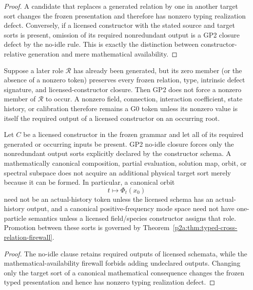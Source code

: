 \documentclass[12pt,a4paper]{article}
\begin{document}
\begin{proof}
A candidate that replaces a generated relation by one in another target sort
changes the frozen presentation and therefore has nonzero typing realization
defect.  Conversely, if a licensed constructor with the stated source and
target sorts is present, omission of its required nonredundant output is a GP2
closure defect by the no-idle rule.  This is exactly the distinction between
constructor-relative generation and mere mathematical availability.
\end{proof}

\begin{corollary}
\label{p2a:cor:zero-member-occurrence-test}
Suppose a later role \(\mathcal R\) has already been generated, but its zero
member (or the absence of a nonzero token) preserves every frozen relation,
type, intrinsic defect signature, and licensed-constructor closure.  Then GP2
does not force a nonzero member of \(\mathcal R\) to occur.  A nonzero field,
connection, interaction coefficient, state history, or calibration therefore
remains a G0 token unless its nonzero value is itself the required output of a
licensed constructor on an occurring root.
\end{corollary}

\begin{corollary}
\label{p2a:cor:declared-output-actualization-boundary}
Let \(C\) be a licensed constructor in the frozen grammar and let all of its
required generated or occurring inputs be present.  GP2 no-idle closure forces
only the nonredundant output sorts explicitly declared by the constructor
schema.  A mathematically canonical composition, partial evaluation, solution
map, orbit, or spectral subspace does not acquire an additional physical target
sort merely because it can be formed.  In particular, a canonical orbit
\[
  t\longmapsto \Phi_t(x_0)
\]
need not be an actual-history token unless the licensed schema has an
actual-history output, and a canonical positive-frequency mode space need not
have one-particle semantics unless a licensed field/species constructor assigns
that role.  Promotion between these sorts is governed by
Theorem~\ref{p2a:thm:typed-cross-relation-firewall}.
\end{corollary}

\begin{proof}
The no-idle clause retains required outputs of licensed schemata, while the
mathematical-availability firewall forbids adding undeclared outputs.  Changing
only the target sort of a canonical mathematical consequence changes the
frozen typed presentation and hence has nonzero typing realization defect.
\end{proof}
\end{document}
